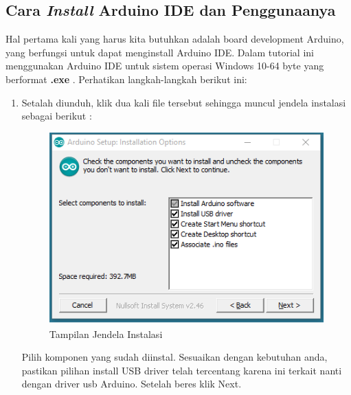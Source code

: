 \subsection{Cara \textit{Install} Arduino IDE dan Penggunaanya}
Hal pertama kali yang harus kita butuhkan adalah board development Arduino, yang berfungsi untuk dapat menginstall Arduino IDE. Dalam tutorial ini menggunakan Arduino IDE untuk sistem operasi Windows 10-64 byte yang berformat \textbf{.exe} . Perhatikan langkah-langkah berikut ini:
\begin{enumerate}
    \item Setalah diunduh, klik dua kali file tersebut sehingga muncul jendela instalasi sebagai berikut :
\begin{figure}[H]
\centering
\includegraphics[width=1\textwidth]{figures/ide1.png}
\caption{Tampilan Jendela Instalasi}
\label{print}
\end{figure}
\par Pilih komponen yang sudah diinstal. Sesuaikan dengan kebutuhan anda, pastikan pilihan install USB driver telah tercentang karena ini terkait nanti dengan driver usb Arduino. Setelah beres klik Next.


\end{enumerate}

